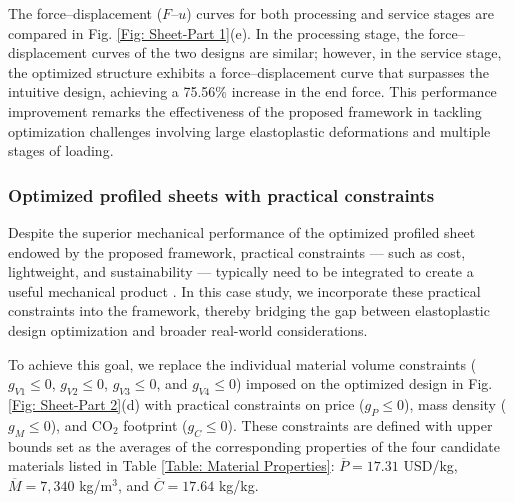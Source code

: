 \documentclass[preprint,11pt]{elsarticle}
\theoremstyle{definition}
\begin{document}
The force--displacement ($F$--$u$) curves for both processing and service stages are compared in Fig. \ref{Fig: Sheet-Part 1}(e). In the processing stage, the force--displacement curves of the two designs are similar; however, in the service stage, the optimized structure exhibits a force--displacement curve that surpasses the intuitive design, achieving a 75.56\% increase in the end force. This performance improvement remarks the effectiveness of the proposed framework in tackling optimization challenges involving large elastoplastic deformations and multiple stages of loading.

\subsubsection{Optimized profiled sheets with practical constraints}

Despite the superior mechanical performance of the optimized profiled sheet endowed by the proposed framework, practical constraints --- such as cost, lightweight, and sustainability --- typically need to be integrated to create a useful mechanical product \citep{kundu2025sustainability}. In this case study, we incorporate these practical constraints into the framework, thereby bridging the gap between elastoplastic design optimization and broader real-world considerations.

To achieve this goal, we replace the individual material volume constraints ($g_{V1} \leq 0$, $g_{V2} \leq 0$, $g_{V3} \leq 0$, and $g_{V4} \leq 0$) imposed on the optimized design in Fig. \ref{Fig: Sheet-Part 2}(d) with practical constraints on price ($g_P \leq 0$), mass density ($g_M \leq 0$), and CO$_2$ footprint ($g_C \leq 0$). These constraints are defined with upper bounds set as the averages of the corresponding properties of the four candidate materials listed in Table \ref{Table: Material Properties}: $\overline{P} = 17.31$ USD/kg, $\overline{M} = 7,340$ kg/m$^3$, and $\overline{C} = 17.64$ kg/kg.
\end{document}
